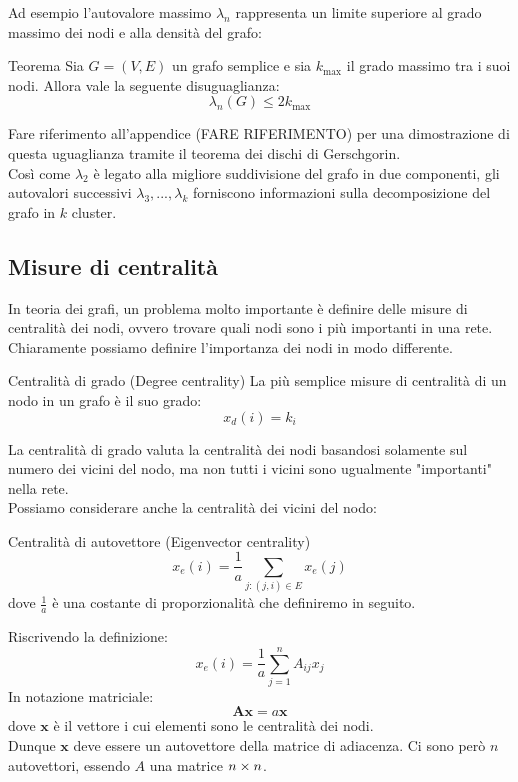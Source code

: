 Ad esempio l'autovalore massimo $\lambda_n$ rappresenta un limite superiore al grado massimo dei nodi e alla densità del grafo:
\begin{boxl}{Teorema}
  Sia $G=(V,E)$ un grafo semplice e sia $k_{\text{max}}$ il grado massimo tra i suoi nodi. Allora vale la seguente disuguaglianza:
  \begin{equation}
    \lambda_n(G) \le 2 k_{\text{max}}
  \end{equation}
\end{boxl}
Fare riferimento all'appendice (FARE RIFERIMENTO) per una dimostrazione di questa uguaglianza tramite il teorema dei dischi di Gerschgorin.\\

Così come $\lambda_2$ è legato alla migliore suddivisione del grafo in due componenti, gli autovalori successivi $\lambda_3,...,\lambda_k$ forniscono informazioni sulla decomposizione del grafo in $k$ cluster.

\subsection{Misure di centralità}
In teoria dei grafi, un problema molto importante è definire delle misure di centralità dei nodi, ovvero trovare quali nodi sono i più importanti in una rete.\\
Chiaramente possiamo definire l'importanza dei nodi in modo differente.\\

\begin{boxb}{Centralità di grado (Degree centrality)}
La più semplice misure di centralità di un nodo in un grafo è il suo grado: 
\begin{equation}
  x_d(i)=k_i
\end{equation}
\end{boxb}
La centralità di grado valuta la centralità dei nodi basandosi solamente sul numero dei vicini del nodo, ma non tutti i vicini sono ugualmente "importanti" nella rete.\\
Possiamo considerare anche la centralità dei vicini del nodo:
\begin{boxb}{Centralità di autovettore (Eigenvector centrality)}
\begin{equation}
    x_e(i)=\frac{1}{a}\sum_{j : (j,i)\in E}^{}x_e(j)
\end{equation}
dove $\frac{1}{a}$ è una costante di proporzionalità che definiremo in seguito.
\end{boxb}
Riscrivendo la definizione:
\begin{equation}
      x_e(i)=\frac{1}{a}\sum_{j=1}^{n}A_{ij}x_j
\end{equation}
In notazione matriciale:
\begin{equation}
  \mathbf{A}\mathbf{x}=a \mathbf{x}
\end{equation}
dove $\mathbf{x}$ è il vettore i cui elementi sono le centralità dei nodi.\\
Dunque $\mathbf{x}$ deve essere un autovettore della matrice di adiacenza. Ci sono però $n$ autovettori, essendo $A$ una matrice $n \times n$.\\

